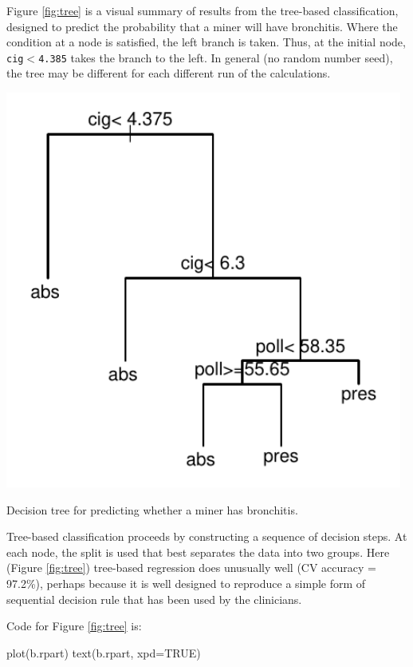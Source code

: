 \documentclass{tufte-book}\usepackage[]{graphicx}\usepackage[]{color}
\newcommand{\txtt}[1]{\texttt{#1}}
\begin{document}
Figure \ref{fig:tree} is a visual summary of results from the
tree-based classification, designed to predict the probability that a
miner will have bronchitis.  Where the condition at a node is
satisfied, the left branch is taken. Thus, at the initial node,
\txtt{cig$<$4.385} takes the branch to the left.  In general (no
random number seed), the tree may be different for each
different run of the calculations.

\begin{marginfigure}
\begin{Schunk}


\centerline{\includegraphics[width=0.98\textwidth]{figs/9-treefig-1} }

\end{Schunk}
\caption{Decision tree for predicting whether a miner has
    bronchitis.
}\label{fig:tree}
\end{marginfigure} 

Tree-based classification proceeds by constructing a sequence of
decision steps. At each node, the split is used that best separates
the data into two groups.  Here (Figure \ref{fig:tree}) tree-based
regression does unusually well (CV accuracy = 97.2\%), perhaps because
it is well designed to reproduce a simple form of sequential decision
rule that has been used by the clinicians.

\begin{marginfigure}
Code for Figure \ref{fig:tree} is:
\begin{Schunk}
\begin{Sinput}
plot(b.rpart)
text(b.rpart, xpd=TRUE)
\end{Sinput}
\end{Schunk}
\end{marginfigure}
\end{document}

